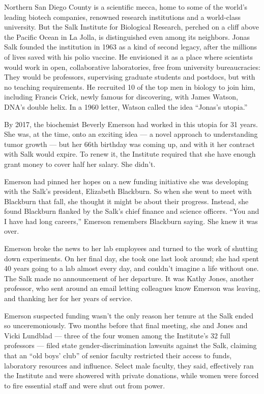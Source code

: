 Northern San Diego County is a scientific mecca, home to some of the
world's leading biotech companies, renowned research institutions and a
world-class university. But the Salk Institute for Biological Research,
perched on a cliff above the Pacific Ocean in La Jolla, is distinguished
even among its neighbors. Jonas Salk founded the institution in 1963 as
a kind of second legacy, after the millions of lives saved with his
polio vaccine. He envisioned it as a place where scientists would work
in open, collaborative laboratories, free from university bureaucracies:
They would be professors, supervising graduate students and postdocs,
but with no teaching requirements. He recruited 10 of the top men in
biology to join him, including Francis Crick, newly famous for
discovering, with James Watson, DNA's double helix. In a 1960 letter,
Watson called the idea ``Jonas's utopia.''

By 2017, the biochemist Beverly Emerson had worked in this utopia for 31
years. She was, at the time, onto an exciting idea --- a novel approach
to understanding tumor growth --- but her 66th birthday was coming up,
and with it her contract with Salk would expire. To renew it, the
Institute required that she have enough grant money to cover half her
salary. She didn't.

Emerson had pinned her hopes on a new funding initiative she was
developing with the Salk's president, Elizabeth Blackburn. So when she
went to meet with Blackburn that fall, she thought it might be about
their progress. Instead, she found Blackburn flanked by the Salk's chief
finance and science officers. ``You and I have had long careers,''
Emerson remembers Blackburn saying. She knew it was over.

Emerson broke the news to her lab employees and turned to the work of
shutting down experiments. On her final day, she took one last look
around; she had spent 40 years going to a lab almost every day, and
couldn't imagine a life without one. The Salk made no announcement of
her departure. It was Kathy Jones, another professor, who sent around an
email letting colleagues know Emerson was leaving, and thanking her for
her years of service.

Emerson suspected funding wasn't the only reason her tenure at the Salk
ended so unceremoniously. Two months before that final meeting, she and
Jones and Vicki Lundblad --- three of the four women among the
Institute's 32 full professors --- filed state gender-discrimination
lawsuits against the Salk, claiming that an ``old boys' club'' of senior
faculty restricted their access to funds, laboratory resources and
influence. Select male faculty, they said, effectively ran the Institute
and were showered with private donations, while women were forced to
fire essential staff and were shut out from power.

